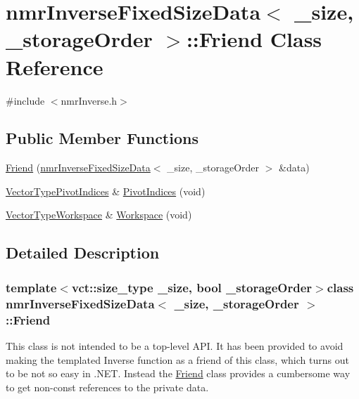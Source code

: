 \hypertarget{classnmr_inverse_fixed_size_data_1_1_friend}{\section{nmr\-Inverse\-Fixed\-Size\-Data$<$ \-\_\-size, \-\_\-storage\-Order $>$\-:\-:Friend Class Reference}
\label{classnmr_inverse_fixed_size_data_1_1_friend}
}


{\ttfamily \#include $<$nmr\-Inverse.\-h$>$}

\subsection*{Public Member Functions}
\begin{DoxyCompactItemize}
\item 
\hyperlink{classnmr_inverse_fixed_size_data_1_1_friend_ae97c8f22cce521942059d09800dafbeb}{Friend} (\hyperlink{classnmr_inverse_fixed_size_data}{nmr\-Inverse\-Fixed\-Size\-Data}$<$ \-\_\-size, \-\_\-storage\-Order $>$ \&data)
\item 
\hyperlink{classnmr_inverse_fixed_size_data_ac8e0c496927d3fe726116c4c6ddf5af2}{Vector\-Type\-Pivot\-Indices} \& \hyperlink{classnmr_inverse_fixed_size_data_1_1_friend_afbd211ddea09f59365e7498486cb59e5}{Pivot\-Indices} (void)
\item 
\hyperlink{classnmr_inverse_fixed_size_data_ac3e08c421f20d9f34917b2cdc03f3b34}{Vector\-Type\-Workspace} \& \hyperlink{classnmr_inverse_fixed_size_data_1_1_friend_a2aec57717e533b52b4cfeddfb5a1d2aa}{Workspace} (void)
\end{DoxyCompactItemize}


\subsection{Detailed Description}
\subsubsection*{template$<$vct\-::size\-\_\-type \-\_\-size, bool \-\_\-storage\-Order$>$class nmr\-Inverse\-Fixed\-Size\-Data$<$ \-\_\-size, \-\_\-storage\-Order $>$\-::\-Friend}

This class is not intended to be a top-\/level A\-P\-I. It has been provided to avoid making the templated Inverse function as a friend of this class, which turns out to be not so easy in .N\-E\-T. Instead the \hyperlink{classnmr_inverse_fixed_size_data_1_1_friend}{Friend} class provides a cumbersome way to get non-\/const references to the private data. 

